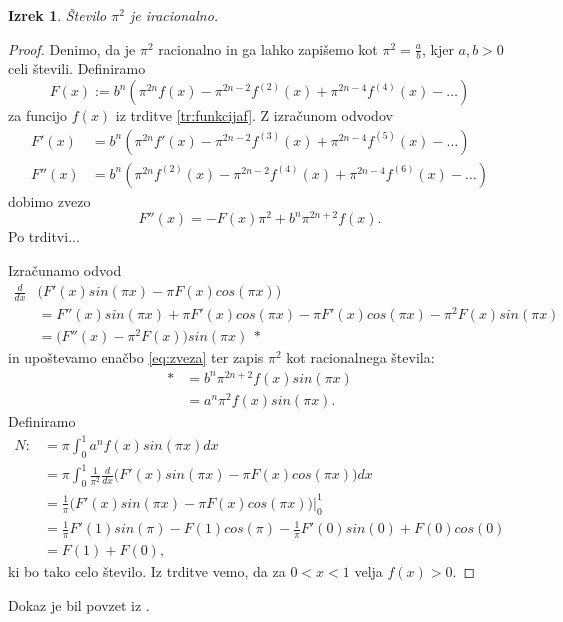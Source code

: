 \documentclass[a4paper]{article}
\theoremstyle{plain}
\newtheorem{izrek}{Izrek}
\newcommand{\odvod}[1]{f^{({#1})}(x)}
\newcommand{\pina}[1]{\pi^{#1}}
\begin{document}
\begin{izrek}
Število $\pina{2}$ je iracionalno.
\end{izrek}
\begin{proof}
Denimo, da je $\pina{2}$ racionalno in ga lahko zapišemo kot $\pina{2}=\frac{a}{b}$, kjer $a,b>0$ celi števili. Definiramo 
\begin{equation*}
F(x):=b^n(\pina{2n}f(x)-\pina{2n-2}\odvod{2}+\pina{2n-4}\odvod{4}-\dots)
\end{equation*}
za funcijo $f(x)$ iz trditve \ref{tr:funkcijaf}. Z izračunom odvodov
\begin{align*}
F'(x)&=b^n(\pina{2n}f'(x)-\pina{2n-2}\odvod{3}+\pina{2n-4}\odvod{5}-\dots) \\
F''(x)&=b^n(\pina{2n}\odvod{2}-\pina{2n-2}\odvod{4}+\pina{2n-4}\odvod{6}-\dots)
\end{align*}
dobimo zvezo
\begin{equation}
F''(x)=-F(x)\pina{2}+b^n\pina{2n+2}f(x).
\label{eq:zveza}
\end{equation}
Po trditvi...

Izračunamo odvod
\begin{align*}
\frac{d}{dx}&\big( F'(x)sin(\pi x)-\pi F(x)cos(\pi x) \big) \\
&=F''(x)sin(\pi x)+\pi F'(x)cos(\pi x)-\pi F'(x)cos(\pi x)-\pina{2} F(x)sin(\pi x) \\
&=\big( F''(x)-\pina{2} F(x) \big) sin(\pi x) ~ *
\end{align*}
in upoštevamo enačbo \eqref{eq:zveza} ter zapis $\pina{2}$ kot racionalnega števila:
\begin{align*}
* &= b^n\pina{2n+2}f(x)sin(\pi x) \\
&=a^n\pina{2}f(x)sin(\pi x).
\end{align*}
Definiramo 
\begin{align*}
N:&=\pi \int_{0}^{1}a^nf(x)sin(\pi x)dx \\
&=\pi \int_{0}^{1}\frac{1}{\pina{2}} \frac{d}{dx}\big( F'(x)sin(\pi x)-\pi F(x)cos(\pi x) \big)dx \\
&=\frac{1}{\pi}\big( F'(x)sin(\pi x)-\pi F(x)cos(\pi x) \big) \big|_0^1 \\
&=\frac{1}{\pi} F'(1)sin(\pi)- F(1)cos(\pi)-\frac{1}{\pi} F'(0)sin(0)+F(0)cos(0)\\
&=F(1)+F(0),
\end{align*}
ki bo tako celo število. Iz trditve vemo, da za $0<x<1$ velja $f(x)>0$. 
\end{proof}
Dokaz je bil povzet iz \cite{dokazi}.



\end{document}
